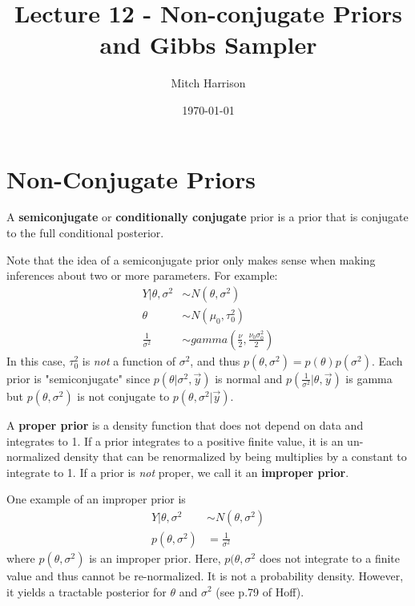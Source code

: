 \documentclass[titlepage, 12pt, leqno]{article}
\title{\Huge{Lecture 12 - Non-conjugate Priors and Gibbs Sampler}}
\author{\large{Mitch Harrison}}
\date{\today}
\begin{document}
\setlength{\parskip}{1\baselineskip}
\setlength{\parindent}{15pt}
\maketitle
\tableofcontents
\newpage


\section{Non-Conjugate Priors}

\begin{definition}
    A \textbf{semiconjugate} or \textbf{conditionally conjugate} prior is a
    prior that is conjugate to the full conditional posterior.
\end{definition}

Note that the idea of a semiconjugate prior only makes sense when making
inferences about two or more parameters. For example:
\begin{align*}
    Y|\theta,\sigma^{2} & \sim N(\theta,\sigma^{2})\\
    \theta & \sim N(\mu_{0}, \tau_{0}^{2}) \\
    \frac{1}{\sigma^{2}} & \sim gamma\left(\frac{\nu}{2},
        \frac{\nu_{0}\sigma_{0}^{2}}{2}\right)
\end{align*}
In this case, $\tau_{0}^{2}$ is \textit{not} a function of $\sigma^{2}$, and
thus $p(\theta, \sigma^{2}) = p(\theta)p(\sigma^{2})$.
Each prior is "semiconjugate" since $p(\theta|\sigma^{2}, \vec y)$ is normal
and $p(\frac{1}{\sigma^{2}} | \theta, \vec y)$ is gamma but $p(\theta,
\sigma^{2})$ is not conjugate to $p(\theta,\sigma^{2}|\vec y)$.

\begin{definition}
    A \textbf{proper prior} is a density function that does not depend on data
    and integrates to 1. If a prior integrates to a positive finite value, it
    is an un-normalized density that can be renormalized by being multiplies by
    a constant to integrate to 1. If a prior is \textit{not} proper, we call it
    an \textbf{improper prior}.
\end{definition}
One example of an improper prior is
\begin{align*}
    Y|\theta,\sigma^{2} & \sim N(\theta, \sigma^{2})\\
    p(\theta,\sigma^{2}) &= \frac{1}{\sigma^{2}}
\end{align*}
where $p(\theta, \sigma^{2})$ is an improper prior. Here, $p(\theta, 
\sigma^{2}$ does not integrate to a finite value and thus cannot be 
re-normalized. It is not a probability density. However, it yields a tractable
posterior for $\theta$ and $\sigma^{2}$ (see p.79 of Hoff).
\end{document}
